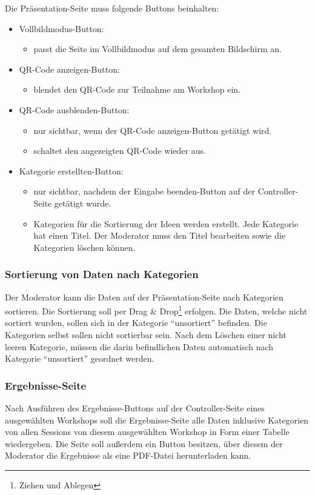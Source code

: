 Die Präsentation-Seite muss folgende Buttons beinhalten:
\begin{itemize}
\item Vollbildmodus-Button:
\begin{itemize}
\item passt die Seite im Vollbildmodus auf dem gesamten Bildschirm an.
\end{itemize}
\item QR-Code anzeigen-Button:
\begin{itemize}
\item blendet den QR-Code zur Teilnahme am Workshop ein.
\end{itemize}
\item QR-Code ausblenden-Button:
\begin{itemize}
\item nur sichtbar, wenn der QR-Code anzeigen-Button getätigt wird.
\item schaltet den angezeigten QR-Code wieder aus.
\end{itemize}
\item Kategorie erstellten-Button:
\begin{itemize}
\item nur sichtbar, nachdem der Eingabe beenden-Button auf der Controller-Seite getätigt wurde.
\item Kategorien für die Sortierung der Ideen werden erstellt. Jede Kategorie hat einen Titel. Der Moderator muss den Titel bearbeiten sowie die Kategorien löschen können.
\end{itemize}
\end{itemize}

\subsubsection*{Sortierung von Daten nach Kategorien}
Der Moderator kann die Daten auf der Präsentation-Seite nach Kategorien sortieren. Die Sortierung soll per Drag \& Drop\footnote{Ziehen und Ablegen} erfolgen. Die Daten, welche nicht sortiert wurden, sollen sich in der Kategorie “unsortiert” befinden. Die Kategorien selbst sollen nicht sortierbar sein. Nach dem Löschen einer nicht leeren Kategorie, müssen die darin befindlichen Daten automatisch nach Kategorie “unsortiert” geordnet werden.

\subsubsection*{Ergebnisse-Seite}
Nach Ausführen des Ergebnisse-Buttons auf der Controller-Seite eines ausgewählten Workshops soll die Ergebnisse-Seite alle Daten inklusive Kategorien von allen Sessions von diesem ausgewählten Workshop in Form einer Tabelle wiedergeben. Die Seite soll außerdem ein Button besitzen, über diesem der Moderator die Ergebnisse als eine PDF-Datei herunterladen kann.

